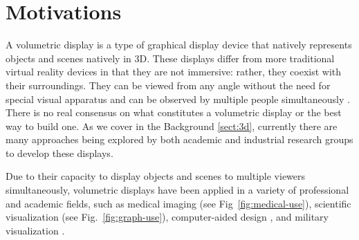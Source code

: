 \section{Motivations}
A volumetric display is a type of graphical display device that natively represents objects and scenes natively in 3D. These displays differ from more traditional virtual reality devices in that they are not immersive: rather, they coexist with their surroundings. They can be viewed from any angle without the need for special visual apparatus and can be observed by multiple people simultaneously \cite{1492264}. \\

There is no real consensus on what constitutes a volumetric display or the best way to build one. As we cover in the Background \ref{sect:3d}, currently there are many approaches being explored by both academic and industrial research groups to develop these displays.

 
\begin{invisBox}
	\hfill
\end{invisBox}

Due to their capacity to display objects and scenes to multiple viewers simultaneously, volumetric displays have been applied in a variety of professional and academic fields, such as medical imaging \cite{Gong2009-vc} (see Fig~\ref{fig:medical-use}), scientific visualization (see Fig.~\ref{fig:graph-use}), computer-aided design \cite{stickland_development_2003}, and military visualization \cite{10.1117/12.785009} \cite{1492264} \cite{noauthor_bae_nodate}. \\

